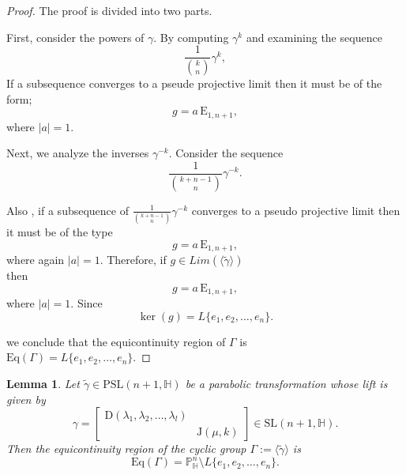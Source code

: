 \documentclass[12pt,reqno]{amsart}
\numberwithin{equation}{section}
\newtheorem{lemma}[theorem]{Lemma}
\theoremstyle{definition}
\def\H{\mathbb H}
\def\P{\mathbb P}
\def\H{\mathbb {H}}
\begin{document}
\begin{proof}
The proof is divided into two parts.

First, consider the powers of $\gamma$. By computing $\gamma^k$ and examining the sequence
\[
\frac{1}{{k \choose n}}\gamma^k,
\]
If a subsequence converges to a pseude projective limit then it must be of the form;
\[
g = a\,\mathrm{E}_{1,n+1},
\]
where $|a| = 1$.

Next, we analyze the inverses $\gamma^{-k}$. Consider the sequence
\[
\frac{1}{{k+n-1 \choose n}} \gamma^{-k}.
\]

Also , if a subsequence of $\frac{1}{{k+n-1 \choose n}} \gamma^{-k}$ converges to a pseudo projective limit then it must be of the type
\[
g = a\,\mathrm{E}_{1,n+1},
\]
where again $|a| = 1$. Therefore, if $g\in Lim(\langle \tilde{\gamma}\rangle)$ 
\\then \[
g = a\,\mathrm{E}_{1,n+1},
\] where $|a|=1$. Since 
\[
\ker(g) = L\{ e_1, e_2, \ldots, e_n \}.
\]

 we conclude that the equicontinuity region of $\Gamma$ is \\ 
$\mathrm{Eq}(\Gamma) = L\{ e_1, e_2, \ldots, e_n \}$. 
\end{proof}


\begin{lemma}
\label{th:par2}
Let $\tilde{\gamma} \in \mathrm{PSL}(n+1, \mathbb{H})$ be a parabolic transformation whose lift is given by 
\[
\gamma = 
\begin{bmatrix}
    \mathrm{D}(\lambda_1, \lambda_2, \ldots, \lambda_l) & \\
    & \mathrm{J}(\mu, k)
\end{bmatrix}
\in \mathrm{SL}(n+1, \mathbb{H}).
\]
Then the equicontinuity region of the cyclic group $\Gamma := \langle \tilde{\gamma} \rangle$ is 
\[
\mathrm{Eq}(\Gamma) = \P^n_\H\setminus L\{ e_1, e_2, \ldots, e_n \}.
\]
\end{lemma}
\end{document}
